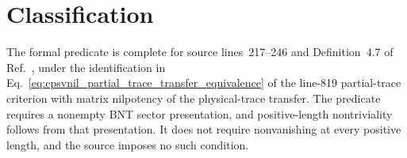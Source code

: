 \documentclass{article}
\begin{document}
\section{Classification}

The formal predicate is complete for source lines~217--246 and
Definition~4.7 of Ref.~\cite{Cirac2016MPDO_arXiv}, under the identification in
Eq.~\ref{eq:cpsvnil_partial_trace_transfer_equivalence} of the line-819
partial-trace criterion with matrix nilpotency of the physical-trace transfer.
The predicate requires a nonempty BNT sector presentation, and positive-length
nontriviality follows from that presentation. It does not require nonvanishing
at every positive length, and the source imposes no such condition.



\end{document}
